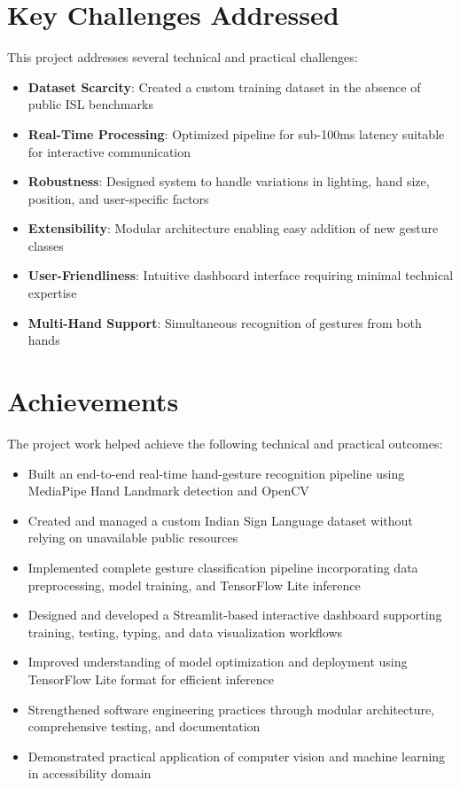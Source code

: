 \documentclass[12pt,a4paper]{report}
\begin{document}
\section{Key Challenges Addressed}

This project addresses several technical and practical challenges:

\begin{itemize}
    \item \textbf{Dataset Scarcity}: Created a custom training dataset in the absence of public ISL benchmarks
    \item \textbf{Real-Time Processing}: Optimized pipeline for sub-100ms latency suitable for interactive communication
    \item \textbf{Robustness}: Designed system to handle variations in lighting, hand size, position, and user-specific factors
    \item \textbf{Extensibility}: Modular architecture enabling easy addition of new gesture classes
    \item \textbf{User-Friendliness}: Intuitive dashboard interface requiring minimal technical expertise
    \item \textbf{Multi-Hand Support}: Simultaneous recognition of gestures from both hands
\end{itemize}

\section{Achievements}

The project work helped achieve the following technical and practical outcomes:

\begin{itemize}
    \item Built an end-to-end real-time hand-gesture recognition pipeline using MediaPipe Hand Landmark detection and OpenCV
    \item Created and managed a custom Indian Sign Language dataset without relying on unavailable public resources
    \item Implemented complete gesture classification pipeline incorporating data preprocessing, model training, and TensorFlow Lite inference
    \item Designed and developed a Streamlit-based interactive dashboard supporting training, testing, typing, and data visualization workflows
    \item Improved understanding of model optimization and deployment using TensorFlow Lite format for efficient inference
    \item Strengthened software engineering practices through modular architecture, comprehensive testing, and documentation
    \item Demonstrated practical application of computer vision and machine learning in accessibility domain
\end{itemize}
\end{document}
